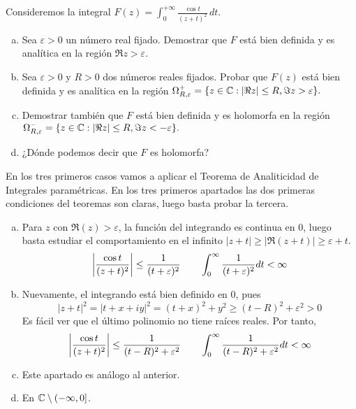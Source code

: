 \documentclass[twoside]{article}
\begin{document}
\newpage
\begin{ejercicio}{3}
Consideremos la integral 
$\displaystyle{F(z)=\int_0^{+\infty}\frac{\cos t}{(z+t)^2}\,dt}$.
\begin{enumerate}[a)]
\item Sea $\varepsilon>0$ un número real fijado. Demostrar que $F$  está bien definida y es analítica en la región $\Re z>\varepsilon$.
\item Sea $\varepsilon>0$ y $R>0$ dos números reales fijados. Probar que $F(z)$ está bien definida y es analítica en la región $\Omega^+_{R,\varepsilon}=\{z\in\mathbb{C}: |\Re z|\le R, \Im z>\varepsilon\}.$
\item Demostrar también que $F$ está bien definida y es holomorfa en la región\newline 
$\Omega^-_{R,\varepsilon}=\{z\in\mathbb{C}: |\Re z|\le R, \Im z<-\varepsilon\}.$
\item ¿Dónde podemos decir que $F$ es holomorfa?
\end{enumerate}
\end{ejercicio}
\begin{solucion}
En los tres primeros casos vamos a aplicar el Teorema de Analiticidad de Integrales paramétricas. En los tres primeros apartados las dos primeras condiciones del teoremas son claras, luego basta probar la tercera.
\begin{enumerate}[a)]
\item Para $z$ con $\Re(z)>\varepsilon$, la función del integrando es continua en 0, luego basta estudiar el comportamiento en el infinito $|z+t| \geq |\Re(z+t)| \geq \varepsilon+t$. 
$$
\left\lvert\frac{\cos t}{(z+t)^2}\right\rvert \leq \frac{1}{(t+\varepsilon)^2} \qquad \int_0^\infty \frac{1}{(t+\varepsilon)^2} dt < \infty
$$
\item Nuevamente, el integrando está bien definido en $0$, pues $$|z+t|^2 = |t+x + iy|^2 = (t+x)^2+y^2 \geq (t-R)^2+\varepsilon^2>0$$
Es fácil ver que el último polinomio no tiene raíces reales. Por tanto,
$$
\left\lvert\frac{\cos t}{(z+t)^2}\right\rvert \leq \frac{1}{(t-R)^2+\varepsilon^2} \qquad \int_0^\infty \frac{1}{(t-R)^2+\varepsilon^2} dt < \infty
$$
\item Este apartado es análogo al anterior.
\item En $\mathbb{C}\setminus (-\infty,0]$.
\end{enumerate}
\end{solucion}
\end{document}
